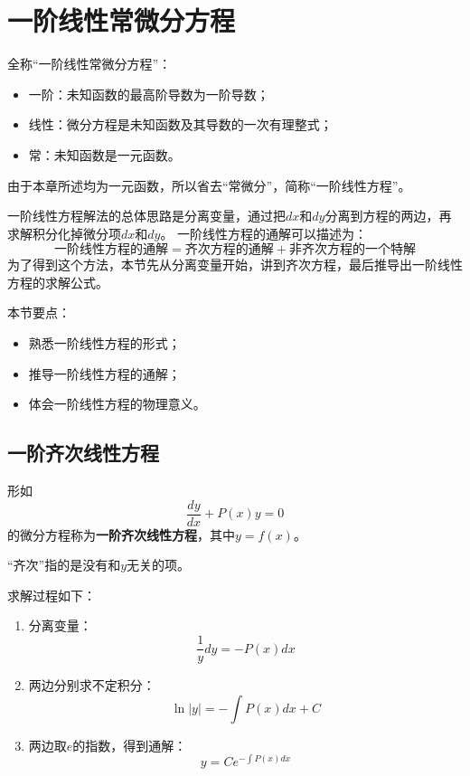 \section{一阶线性常微分方程}

全称“一阶线性常微分方程”：
\begin{itemize}
    \item 一阶：未知函数的最高阶导数为一阶导数；
    \item 线性：微分方程是未知函数及其导数的一次有理整式；
    \item 常：未知函数是一元函数。
\end{itemize}
由于本章所述均为一元函数，所以省去“常微分”，简称“一阶线性方程”。

一阶线性方程解法的总体思路是分离变量，通过把$dx$和$dy$分离到方程的两边，再求解积分化掉微分项$dx$和$dy$。
一阶线性方程的通解可以描述为：
\[
\text{一阶线性方程的通解} = \text{齐次方程的通解} + \text{非齐次方程的一个特解}
\]
为了得到这个方法，本节先从分离变量开始，讲到齐次方程，最后推导出一阶线性方程的求解公式。

本节要点：
\begin{itemize}
    \item 熟悉一阶线性方程的形式；
    \item 推导一阶线性方程的通解；
    \item 体会一阶线性方程的物理意义。
\end{itemize}

\subsection{一阶齐次线性方程}

\begin{definition}[一阶齐次线性方程]
形如
\[
\frac{dy}{dx}+P\left( x \right) y=0
\]
的微分方程称为{\bf 一阶齐次线性方程}，其中$y=f\left( x \right) $。
\end{definition}

\begin{tcolorbox}
“齐次”指的是没有和$y$无关的项。
\end{tcolorbox}

求解过程如下：
\begin{enumerate}
    \item 分离变量：
    \[
    \frac{1}{y}dy=-P\left( x \right) dx
    \]
    \item 两边分别求不定积分：
    \[
    \ln \left| y \right|=-\int{P\left( x \right) dx}+C
    \]
    \item 两边取$e$的指数，得到通解：
    \[
    y=Ce^{-\int{P\left( x \right) dx}}
    \]
\end{enumerate}

